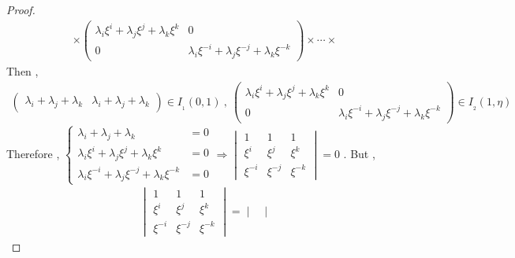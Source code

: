 \documentclass{article}
\begin{document}
\begin{proof}
\begin{align*}
        \times
        \begin{pmatrix}
            \lambda_i\xi^{\scriptscriptstyle i}+\lambda_j\xi^{\scriptscriptstyle j}+\lambda_k\xi^{\scriptscriptstyle k}&0\\
            0&\lambda_i\xi^{\scriptscriptstyle-i}+\lambda_j\xi^{\scriptscriptstyle-j}+\lambda_k\xi^{\scriptscriptstyle-k}
        \end{pmatrix}
        \times\cdots\times
\end{align*} 
Then ,
\begin{align*}
        \begin{pmatrix}
           \lambda_i+\lambda_j+\lambda_k&\lambda_i+\lambda_j+\lambda_k 
        \end{pmatrix}\in{I_{_1}(0,1)}
        \:,\:
        \begin{pmatrix}
             \lambda_i\xi^{\scriptscriptstyle i}+\lambda_j\xi^{\scriptscriptstyle j}+\lambda_k\xi^{\scriptscriptstyle k}&0\\
            0&\lambda_i\xi^{\scriptscriptstyle-i}+\lambda_j\xi^{\scriptscriptstyle-j}+\lambda_k\xi^{\scriptscriptstyle-k}
        \end{pmatrix}\in{I_{_2}(1,\eta)}
\end{align*}
Therefore , 
$
\left\{
\begin{array}{lll}
\lambda_i+\lambda_j+\lambda_k&=0\\
\lambda_i\xi^{\scriptscriptstyle i}+\lambda_j\xi^{\scriptscriptstyle j}+\lambda_k\xi^{\scriptscriptstyle k}&=0\\
\lambda_i\xi^{\scriptscriptstyle-i}+\lambda_j\xi^{\scriptscriptstyle-j}+\lambda_k\xi^{\scriptscriptstyle-k}&=0
\end{array}
\right.
\Longrightarrow\begin{vmatrix}
    1&1&1\\
    \xi^{\scriptscriptstyle i}&\xi^{\scriptscriptstyle j}&\xi^{\scriptscriptstyle k}\\
    \xi^{\scriptscriptstyle-i}&\xi^{\scriptscriptstyle-j}&\xi^{\scriptscriptstyle-k}
\end{vmatrix}=0$ . But ,
\begin{align*}
    \begin{vmatrix}
    1&1&1\\
    \xi^{\scriptscriptstyle i}&\xi^{\scriptscriptstyle j}&\xi^{\scriptscriptstyle k}\\
    \xi^{\scriptscriptstyle-i}&\xi^{\scriptscriptstyle-j}&\xi^{\scriptscriptstyle-k}
\end{vmatrix}=
\begin{vmatrix}

\end{vmatrix}
\end{align*}
\end{proof}
\end{document}
